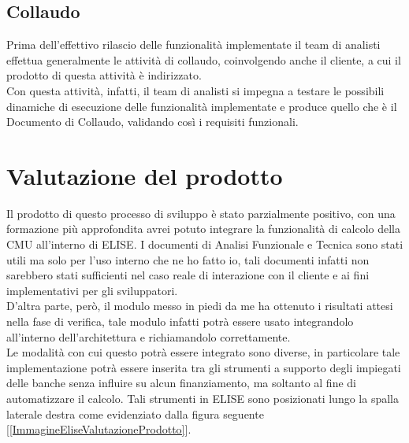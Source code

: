 \subsection{Collaudo}

	Prima dell'effettivo rilascio delle funzionalità implementate il team di analisti effettua generalmente le attività di collaudo, coinvolgendo anche il cliente, a cui il prodotto di questa attività è indirizzato.\\
	
	Con questa attività, infatti, il team di analisti si impegna a testare le possibili dinamiche di esecuzione delle funzionalità implementate e produce quello che è il Documento di Collaudo, validando così i requisiti funzionali.

\section{Valutazione del prodotto}

	Il prodotto di questo processo di sviluppo è stato parzialmente positivo, con una formazione più approfondita avrei potuto integrare la funzionalità di calcolo della CMU all'interno di ELISE. I documenti di Analisi Funzionale e Tecnica sono stati utili ma solo per l'uso interno che ne ho fatto io, tali documenti infatti non sarebbero stati sufficienti nel caso reale di interazione con il cliente e ai fini implementativi per gli sviluppatori.\\
	
	D'altra parte, però, il modulo messo in piedi da me ha ottenuto i risultati attesi nella fase di verifica, tale modulo infatti potrà essere usato integrandolo all'interno dell'architettura e richiamandolo correttamente.\\
	
	Le modalità con cui questo potrà essere integrato sono diverse, in particolare tale implementazione potrà essere inserita tra gli strumenti a supporto degli impiegati delle banche senza influire su alcun finanziamento, ma soltanto al fine di automatizzare il calcolo. Tali strumenti in ELISE sono posizionati lungo la spalla laterale destra come evidenziato dalla figura seguente [\ref{ImmagineEliseValutazioneProdotto}].
	
